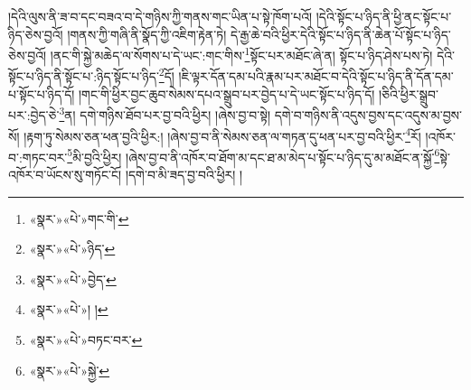 །དེའི་ལུས་ནི་ཟ་བ་དང་བཟའ་བ་དེ་གཉིས་ཀྱི་གནས་གང་ཡིན་པ་སྟེ་ཁོག་པའོ། །དེའི་སྟོང་པ་ཉིད་ནི་ཕྱི་ནང་སྟོང་པ་ཉིད་ཅེས་བྱའོ། །གནས་ཀྱི་གཞི་ནི་སྣོད་ཀྱི་འཇིག་རྟེན་ཏེ། དེ་རྒྱ་ཆེ་བའི་ཕྱིར་དེའི་སྟོང་པ་ཉིད་ནི་ཆེན་པོ་སྟོང་པ་ཉིད་ཅེས་བྱའོ། །ནང་གི་སྐྱེ་མཆེད་ལ་སོགས་པ་དེ་ཡང་:གང་གིས་\footnote{«སྣར་»«པེ་»གང་གི་}སྟོང་པར་མཐོང་ཞེ་ན། སྟོང་པ་ཉིད་ཤེས་པས་ཏེ། དེའི་སྟོང་པ་ཉིད་ནི་སྟོང་པ་:ཉིད་སྟོང་པ་ཉིད་\footnote{«སྣར་»«པེ་»ཉིད་}དོ། །ཇི་ལྟར་དོན་དམ་པའི་རྣམ་པར་མཐོང་བ་དེའི་སྟོང་པ་ཉིད་ནི་དོན་དམ་པ་སྟོང་པ་ཉིད་དོ། །གང་གི་ཕྱིར་བྱང་ཆུབ་སེམས་དཔའ་སྒྲུབ་པར་བྱེད་པ་དེ་ཡང་སྟོང་པ་ཉིད་དོ། །ཅིའི་ཕྱིར་སྒྲུབ་པར་:བྱེད་ཅེ་\footnote{«སྣར་»«པེ་»བྱེད་}ན། དགེ་གཉིས་ཐོབ་པར་བྱ་བའི་ཕྱིར། །ཞེས་བྱ་བ་སྟེ། དགེ་བ་གཉིས་ནི་འདུས་བྱས་དང་འདུས་མ་བྱས་སོ། །རྟག་ཏུ་སེམས་ཅན་ཕན་བྱའི་ཕྱིར:། །ཞེས་བྱ་བ་ནི་སེམས་ཅན་ལ་གཏན་དུ་ཕན་པར་བྱ་བའི་ཕྱིར་\footnote{«སྣར་»«པེ་»། །}རོ། །འཁོར་བ་:གཏང་བར་\footnote{«སྣར་»«པེ་»བཏང་བར་}མི་བྱའི་ཕྱིར། །ཞེས་བྱ་བ་ནི་འཁོར་བ་ཐོག་མ་དང་ཐ་མ་མེད་པ་སྟོང་པ་ཉིད་དུ་མ་མཐོང་ན་སྐྱོ་\footnote{«སྣར་»«པེ་»སྐྱེ་}སྟེ་འཁོར་བ་ཡོངས་སུ་གཏོང་ངོ། །དགེ་བ་མི་ཟད་བྱ་བའི་ཕྱིར། །
